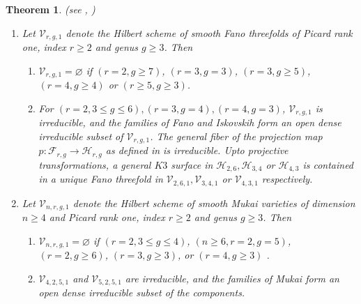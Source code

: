 \documentclass[11pt,twoside]{amsart}
\theoremstyle{plain}
\numberwithin{equation}{section}
\newtheorem{theorem}{Theorem}[section]
\theoremstyle{definition}
\begin{document}
\begin{theorem}(see , )\label{classification of mukai varieties intro}
\begin{enumerate}
    \item Let $\mathcal{V}_{r,g,1}$ denote the Hilbert scheme of smooth Fano threefolds of Picard rank one, index $r \geq 2$ and genus $g \geq 3$. Then

\begin{enumerate}
    \item $\mathcal{V}_{r,g,1} = \varnothing$ if $(r = 2, g \geq 7)$, $(r = 3, g = 3)$, $(r = 3, g \geq 5)$, $(r = 4, g \geq 4)$ or $(r \geq 5, g \geq 3)$. 
    \item For $(r = 2, 3 \leq g \leq 6), (r = 3, g = 4), (r = 4, g = 3)$, $\mathcal{V}_{r,g,1}$ is irreducible, and the families of Fano and Iskovskih form an open dense irreducible subset of $\mathcal{V}_{r,g,1}$. The general fiber of the projection map $p: \mathcal{F}_{r,g} \to \mathcal{H}_{r,g}$ as defined in  is irreducible. Upto projective transformations, a general $K3$ surface in $\mathcal{H}_{2,6}, \mathcal{H}_{3,4}$ or $ \mathcal{H}_{4,3}$ is contained in a unique Fano threefold in $\mathcal{V}_{2,6,1}, \mathcal{V}_{3,4,1}$ or $ \mathcal{V}_{4,3,1}$ respectively.
\end{enumerate}

\item Let $\mathcal{V}_{n,r,g,1}$ denote the Hilbert scheme of smooth Mukai varieties of dimension $n \geq 4$ and Picard rank one, index $r \geq 2$ and genus $g \geq 3$. Then 
\begin{enumerate}
    \item $\mathcal{V}_{n,r,g,1} = \varnothing$ if $(r = 2, 3 \leq g \leq 4)$, $(n \geq 6, r = 2, g = 5)$, $(r = 2, g \geq 6)$, $(r = 3, g \geq 3)$, or $(r = 4, g \geq 3)$ . 
    \item $\mathcal{V}_{4,2,5,1}$ and $\mathcal{V}_{5,2,5,1}$ are irreducible, and the families of Mukai form an open dense irreducible subset of the components.
\end{enumerate}

\end{enumerate} 

\end{theorem}
\end{document}
